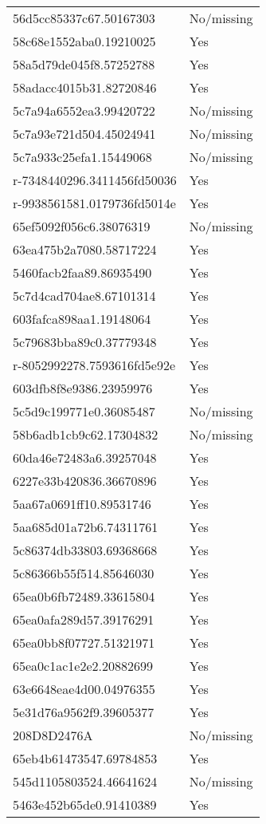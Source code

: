\begin{tabular}{ll}
56d5cc85337c67.50167303 & No/missing \\
58c68e1552aba0.19210025 & Yes \\
58a5d79de045f8.57252788 & Yes \\
58adacc4015b31.82720846 & Yes \\
5c7a94a6552ea3.99420722 & No/missing \\
5c7a93e721d504.45024941 & No/missing \\
5c7a933c25efa1.15449068 & No/missing \\
r-7348440296.3411456fd50036 & Yes \\
r-9938561581.0179736fd5014e & Yes \\
65ef5092f056c6.38076319 & No/missing \\
63ea475b2a7080.58717224 & Yes \\
5460facb2faa89.86935490 & Yes \\
5c7d4cad704ae8.67101314 & Yes \\
603fafca898aa1.19148064 & Yes \\
5c79683bba89c0.37779348 & Yes \\
r-8052992278.7593616fd5e92e & Yes \\
603dfb8f8e9386.23959976 & Yes \\
5c5d9c199771e0.36085487 & No/missing \\
58b6adb1cb9c62.17304832 & No/missing \\
60da46e72483a6.39257048 & Yes \\
6227e33b420836.36670896 & Yes \\
5aa67a0691ff10.89531746 & Yes \\
5aa685d01a72b6.74311761 & Yes \\
5c86374db33803.69368668 & Yes \\
5c86366b55f514.85646030 & Yes \\
65ea0b6fb72489.33615804 & Yes \\
65ea0afa289d57.39176291 & Yes \\
65ea0bb8f07727.51321971 & Yes \\
65ea0c1ac1e2e2.20882699 & Yes \\
63e6648eae4d00.04976355 & Yes \\
5e31d76a9562f9.39605377 & Yes \\
208D8D2476A & No/missing \\
65eb4b61473547.69784853 & Yes \\
545d1105803524.46641624 & No/missing \\
5463e452b65de0.91410389 & Yes \\

\end{tabular}
